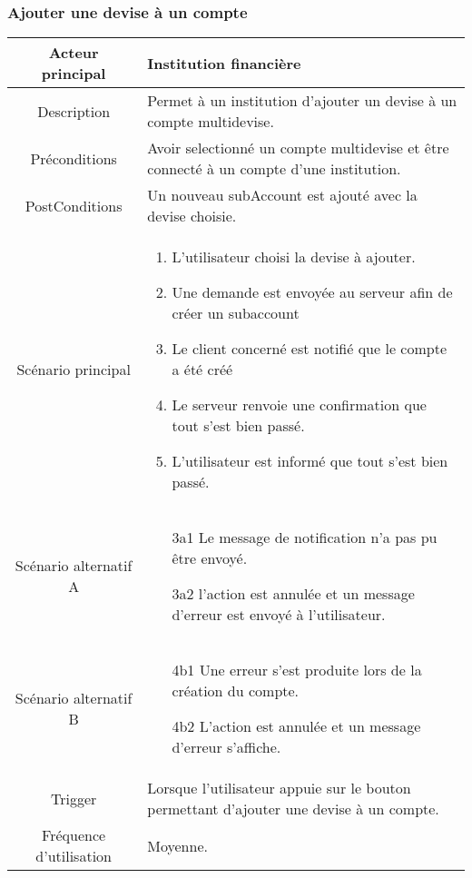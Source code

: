 \documentclass{article}
\begin{document}
\subsubsection{Ajouter une devise à un compte}
\begin{table}[h]
   \begin{tabular}{|c|p{10cm}|}
      \hline
      Acteur principal&Institution financière\\
      \hline
      Description&Permet à un institution d'ajouter un devise à un compte multidevise.\\
      \hline
      Préconditions&Avoir selectionné un compte multidevise et être connecté à un compte d'une institution.\\
      \hline
      PostConditions&Un nouveau subAccount est ajouté avec la devise choisie.\\
      \hline
      Scénario principal& 
            \begin{enumerate}
               \item L'utilisateur choisi la devise à ajouter.
               \item Une demande est envoyée au serveur afin de créer un subaccount
               \item Le client concerné est notifié que le compte a été créé
               \item Le serveur renvoie une confirmation que tout s'est bien passé.
               \item L'utilisateur est informé que tout s'est bien passé.
            \end{enumerate}     \\
      \hline
      Scénario alternatif A& 
            \begin{itemize}
               \item[3a1] Le message de notification n'a pas pu être envoyé.
               \item[3a2] l'action est annulée et un message d'erreur est envoyé à l'utilisateur.  
            \end{itemize}     \\
      \hline
      Scénario alternatif B&
            \begin{itemize}
               \item[4b1] Une erreur s'est produite lors de la création du compte.
               \item[4b2] L'action est annulée et un message d'erreur s'affiche.  
            \end{itemize}\\
      \hline
      Trigger&Lorsque l'utilisateur appuie sur le bouton permettant d'ajouter une devise à un compte.\\
      \hline
      Fréquence d'utilisation&Moyenne.\\
      \hline
   \end{tabular}
\end{table}
\end{document}
